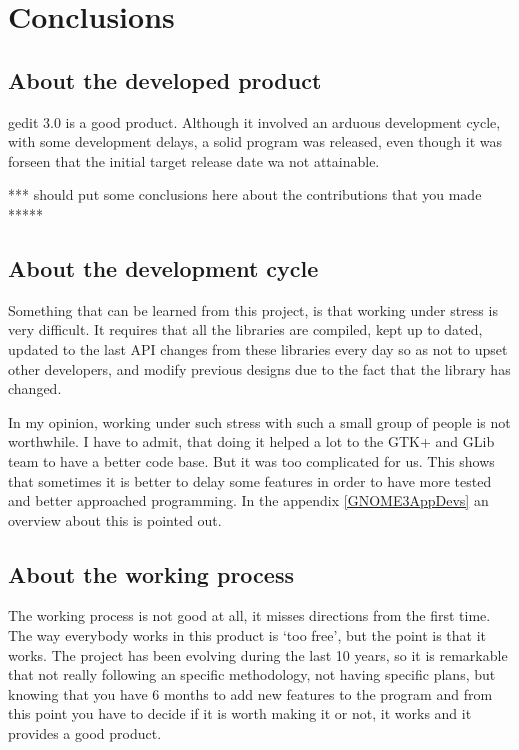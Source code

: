 \chapter{Conclusions}

\section{About the developed product}

gedit 3.0 is a good product. Although it involved an arduous development cycle, with some development delays,  
a solid program was released, even though it was forseen that the  initial target release date wa not attainable.


*** should put some conclusions here about the contributions that you made  *****



\section{About the development cycle}



Something that can be learned from this project, is that working under stress is very difficult. It requires that all the libraries are compiled, 
kept up to dated, updated to the last API changes from these libraries every day so as not to upset other developers, and 
modify previous designs due to the fact that the library has changed.

In my opinion, working under such stress with such a small group of people is not worthwhile.   I have to admit, that doing it helped a lot to the GTK+ and GLib team to have a better code base. But it was too complicated for us. This shows that sometimes it is better to delay some features in order to have more tested and better approached programming. In the appendix \ref{GNOME3AppDevs} an overview about this is pointed out.

\section{About the working process}

The working process is not good at all, it misses directions from the first time. The way everybody works in this product is `too free', but the point is that it works. The project has been evolving during the last 10 years, so it is remarkable that not really following an specific methodology, not having specific plans, but knowing that you have 6 months to add new features to the program and from this point you have to decide if it is worth making it or not, it works and it provides a good product.

